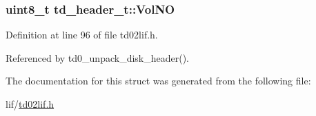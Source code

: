 \subsubsection[{\texorpdfstring{Vol\+NO}{VolNO}}]{\setlength{\rightskip}{0pt plus 5cm}uint8\+\_\+t td\+\_\+header\+\_\+t\+::\+Vol\+NO}\hypertarget{structtd__header__t_a081c4518281071d65fe82f6c8260b1f5}{}\label{structtd__header__t_a081c4518281071d65fe82f6c8260b1f5}


Definition at line 96 of file td02lif.\+h.



Referenced by td0\+\_\+unpack\+\_\+disk\+\_\+header().



The documentation for this struct was generated from the following file\+:\begin{DoxyCompactItemize}
\item 
lif/\hyperlink{td02lif_8h}{td02lif.\+h}\end{DoxyCompactItemize}
